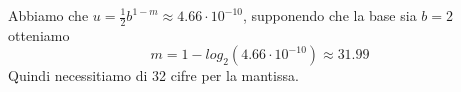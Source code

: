 Abbiamo che 
\( u=\frac{1}{2} b ^{1-m} \approx 4.66 \cdot 10^{-10} \), 
supponendo che la base sia \( b=2 \) otteniamo
\[
	m = 1 - log_2{(4.66 \cdot 10 ^{-10})} \approx 31.99
\]
Quindi necessitiamo di 32 cifre per la mantissa.